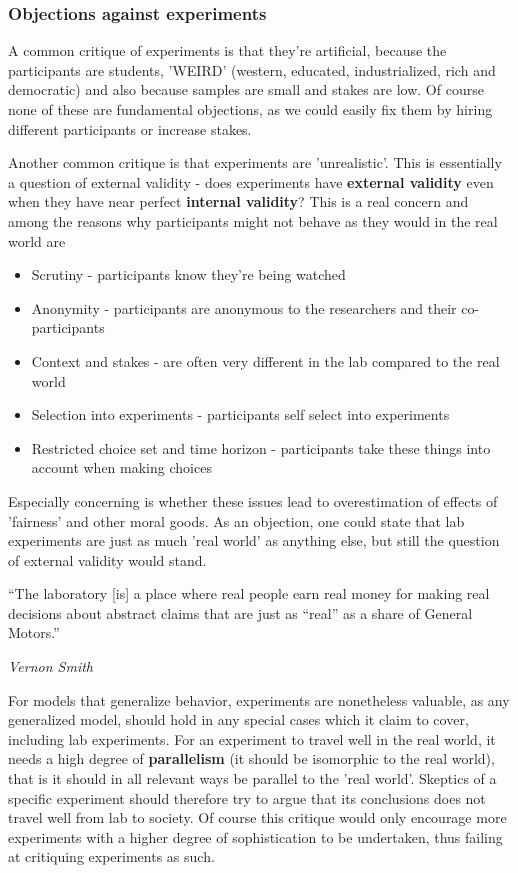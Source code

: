 \documentclass[12pt, a4paper]{article}
\begin{document}
\begin{multicols}{2}
\subsubsection{Objections against experiments}
A common critique of experiments is that they're artificial, because the participants are students, 'WEIRD' (western, educated, industrialized, rich and democratic) and also because samples are small and stakes are low. Of course none of these are fundamental objections, as we could easily fix them by hiring different participants or increase stakes. 

Another common critique is that experiments are 'unrealistic'. This is essentially a question of external validity - does experiments have \textbf{external validity} even when they have near perfect \textbf{internal validity}? This is a real concern and among the reasons why participants might not behave as they would in the real world are
\begin{itemize}
\item Scrutiny - participants know they're being watched
\item Anonymity - participants are anonymous to the researchers and their co-participants
\item Context and stakes - are often very different in the lab compared to the real world
\item Selection into experiments - participants self select into experiments
\item Restricted choice set and time horizon - participants take these things into account when making choices
\end{itemize}
Especially concerning is whether these issues lead to overestimation of effects of 'fairness' and other moral goods. As an objection, one could state that lab experiments are just as much 'real world' as anything else, but still the question of external validity would stand.
\epigraph{“The laboratory [is] a place where real people earn real money for making real decisions about abstract claims that are just as “real” as a share of General Motors.”}{\textit{Vernon Smith}}
For models that generalize behavior, experiments are nonetheless valuable, as any generalized model, should hold in any special cases which it claim to cover, including lab experiments. 
For an experiment to travel well in the real world, it needs a high degree of \textbf{parallelism} (it should be isomorphic to the real world), that is it should in all relevant ways be parallel to the 'real world'. Skeptics of a specific experiment should therefore try to argue that its conclusions does not travel well from lab to society. Of course this critique would only encourage more experiments with a higher degree of sophistication to be undertaken, thus failing at critiquing experiments as such. 

\end{multicols}
\end{document}
